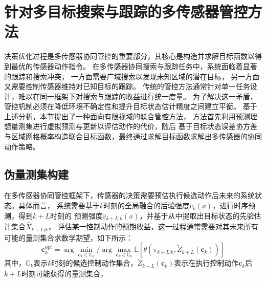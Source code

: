 \section{针对多目标搜索与跟踪的多传感器管控方法}
决策优化过程是多传感器协同管控的重要部分，其核心是构造并求解目标函数以得到最优的传感器动作指令。
在多传感器协同搜索与跟踪任务中，系统面临着显著的跟踪和搜索冲突，
一方面需要广域搜索以发现未知区域的潜在目标，
另一方面又需要控制传感器维持对已知目标的跟踪。
传统的管控方法通常针对单一任务设计，难以在同一框架下对搜索与跟踪的收益进行统一度量。
为了解决这一矛盾，管控机制必须在降低环境不确定性和提升目标状态估计精度之间建立平衡。
基于上述分析，本节提出了一种面向有限视域的联合管控方法，
方法首先利用预测理想量测集进行虚拟预测与更新以评估动作的代价，随后
基于目标状态误差协方差与区域网格概率构造联合目标函数，最终通过求解目标函数求解出多传感器的协同动作策略。

\subsection{伪量测集构建}
在多传感器协同管控框架下，传感器的决策需要预估执行候选动作后未来的系统状态。具体而言，
系统需要基于$k$时刻的全局融合的后验强度$\bar{v}_k(x)$，进行时序预测，得到$k+L$时刻的
预测强度$\bar{v}_{k+L|k}(x)$，并基于从中提取出目标状态的先验估计集合$\hat{X}_{k+L|k}$，
评估某一控制动作的预期收益，这一过程通常需要对其未来所有可能的量测集合求数学期望，如下所示：
\begin{equation}
\boldsymbol{c}_k^\mathrm{opt}=\arg\min_{\boldsymbol{c}_k\in\mathbb{C}_k}/\arg\max_{\boldsymbol{c}_k\in\mathbb{C}_k}\mathbb{E}\left[\theta\left(\bar{\pi}_{k+L|k},\tilde{Z}_{k+L}(\boldsymbol{c}_k)\right)\right]
\label{eq:GCI_Fusion}
\end{equation}
其中，$\mathbb{C}_k$表示$k$时刻的候选控制动作集合，$\tilde{Z}_{k+L}(\boldsymbol{c}_k)$表示在执行控制动作$\boldsymbol{c}_k$后$k+L$时刻可能获得的量测集合，


